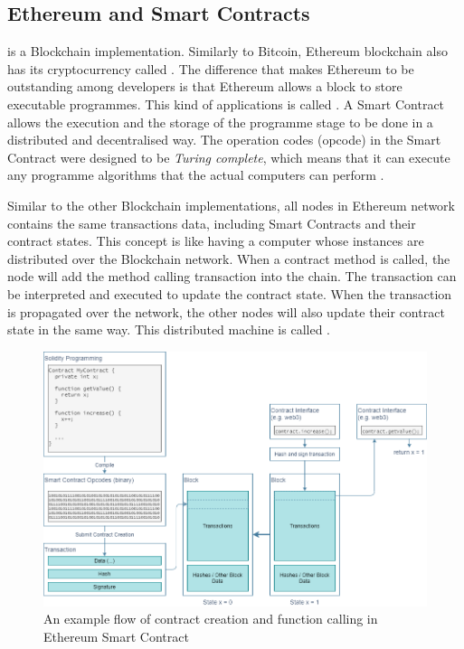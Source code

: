\subsection{Ethereum and Smart Contracts} \label{Background-Blockchain-Ethereum}

\npara {} is a Blockchain implementation.
Similarly to Bitcoin, Ethereum blockchain also has its cryptocurrency called .
The difference that makes Ethereum to be outstanding among developers is that Ethereum allows a block to store executable programmes.
This kind of applications is called .
A Smart Contract allows the execution and the storage of the programme stage to be done in a distributed and decentralised way.
The operation codes (opcode) in the Smart Contract were designed to be \textit{Turing complete}, which means that it can execute any programme algorithms that the actual computers can perform \citep{EthereumWhite}.

\npara Similar to the other Blockchain implementations, all nodes in Ethereum network contains the same transactions data, including Smart Contracts and their contract states.
This concept is like having a computer whose instances are distributed over the Blockchain network.
When a contract method is called, the node will add the method calling transaction into the chain.
The transaction can be interpreted and executed to update the contract state.
When the transaction is propagated over the network, the other nodes will also update their contract state in the same way.
This distributed machine is called .

\begin{figure}[htb!]
  \centering
  \includegraphics[width=\textwidth]{images/BackgroundEthereum.png}
  \caption{An example flow of contract creation and function calling in Ethereum Smart Contract}
  \label{fig:BackgroundEthereum}
\end{figure}

